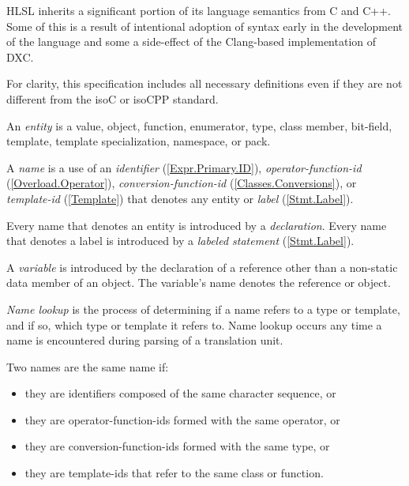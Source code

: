 
\begin{note}
  HLSL inherits a significant portion of its language semantics from C and
  C++. Some of this is a result of intentional adoption of syntax early in the
  development of the language and some a side-effect of the Clang-based
  implementation of DXC.

  For clarity, this specification includes all necessary definitions even if
  they are not different from the \gls{isoC} or \gls{isoCPP} standard.
\end{note}


\p An \textit{entity} is a value, object, function, enumerator, type, class
member, bit-field, template, template specialization, namespace, or pack.

\p A \textit{name} is a use of an \textit{identifier} (\ref{Expr.Primary.ID}),
\textit{operator-function-id} (\ref{Overload.Operator}),
\textit{conversion-function-id} (\ref{Classes.Conversions}),
or \textit{template-id} (\ref{Template}) that denotes any entity or
\textit{label} (\ref{Stmt.Label}).

\p Every name that denotes an entity is introduced by a \textit{declaration}.
Every name that denotes a label is introduced by a \textit{labeled statement}
(\ref{Stmt.Label}).

\p A \textit{variable} is introduced by the declaration of a reference other
than a non-static data member of an object. The variable's name denotes the
reference or object.

\p \textit{Name lookup} is the process of determining if a name refers to a type
or template, and if so, which type or template it refers to. Name lookup occurs
any time a name is encountered during parsing of a translation unit.

\p Two names are the same name if:
\begin{itemize}
\item they are identifiers composed of the same character sequence, or
\item they are operator-function-ids formed with the same operator, or
\item they are conversion-function-ids formed with the same type, or
\item they are template-ids that refer to the same class or function.
\end{itemize}


